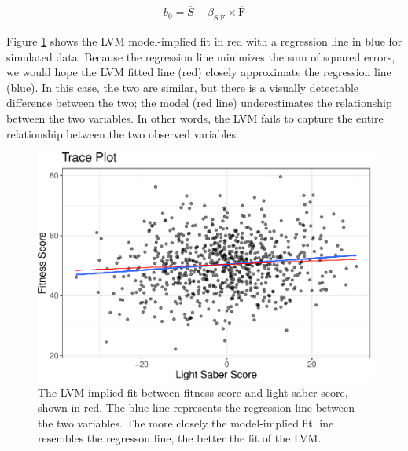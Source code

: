 \documentclass[
  english,
  doc]{apa6}
\begin{document}
\[b_0=\overline{S}-\beta_{\text{S}|\text{F}}\times \overline{\text{F}}\]

Figure \ref{fig:trace1} shows the LVM model-implied fit in red with a regression line in blue for simulated data. Because the regression line minimizes the sum of squared errors, we would hope the LVM fitted line (red) closely approximate the regression line (blue). In this case, the two are similar, but there is a visually detectable difference between the two; the model (red line) underestimates the relationship between the two variables. In other words, the LVM fails to capture the entire relationship between the two observed variables.

\begin{figure}
\centering
\includegraphics{flexplavaan_draft_files/figure-latex/trace1-1.pdf}
\caption{\label{fig:trace1}The LVM-implied fit between fitness score and light saber score, shown in red. The blue line represents the regression line between the two variables. The more closely the model-implied fit line resembles the regresson line, the better the fit of the LVM.}
\end{figure}
\end{document}
